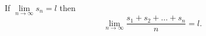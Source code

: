 If $\lim\limits_{n \to \infty} s_{n} = l$ then
\[
\lim_{n \to \infty} \frac{s_{1} + s_{2} + \dots + s_{n}}{n} = l.
\]

